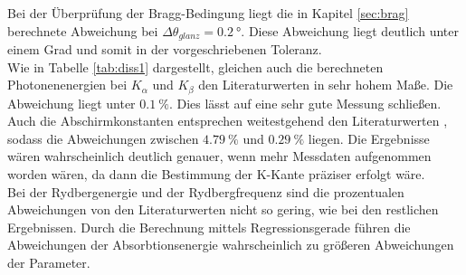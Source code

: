 Bei der Überprüfung der Bragg-Bedingung liegt die in Kapitel \ref{sec:brag} berechnete Abweichung bei $\Delta\theta_{glanz}=\SI{0.2}{\degree}$.
Diese Abweichung liegt deutlich unter einem Grad und somit in der vorgeschriebenen Toleranz.
\\\noindent
Wie in Tabelle \ref{tab:diss1} dargestellt, gleichen auch die berechneten Photonenenergien bei $K_\alpha$ und $K_\beta$
den Literaturwerten in sehr hohem Maße. Die Abweichung liegt unter $\SI{0.1}{\percent}$. Dies lässt auf eine sehr gute Messung schließen.
\\\noindent
Auch die Abschirmkonstanten entsprechen weitestgehend den Literaturwerten \cite{AP05}, sodass die Abweichungen zwischen $\SI{4.79}{\percent}$
und $\SI{0.29}{\percent}$ liegen. Die Ergebnisse wären wahrscheinlich deutlich genauer, wenn mehr Messdaten aufgenommen worden wären, da
dann die Bestimmung der K-Kante präziser erfolgt wäre.
\\\noindent
Bei der Rydbergenergie und der Rydbergfrequenz sind die prozentualen Abweichungen von den Literaturwerten \cite{AP06} nicht so gering, wie bei
den restlichen Ergebnissen. Durch die Berechnung mittels Regressionsgerade führen die Abweichungen der Absorbtionsenergie wahrscheinlich
zu größeren Abweichungen der Parameter.
